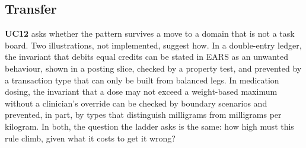 \subsection{Transfer}

\textbf{UC12} asks whether the pattern survives a move to a domain that is not a task board. Two
illustrations, not implemented, suggest how. In a double-entry ledger, the invariant that debits
equal credits can be stated in EARS as an unwanted behaviour, shown in a posting slice, checked by
a property test, and prevented by a transaction type that can only be built from balanced legs.
In medication dosing, the invariant that a dose may not exceed a weight-based maximum without a
clinician's override can be checked by boundary scenarios and prevented, in part, by types that
distinguish milligrams from milligrams per kilogram. In both, the question the ladder asks is the
same: how high must this rule climb, given what it costs to get it wrong?
